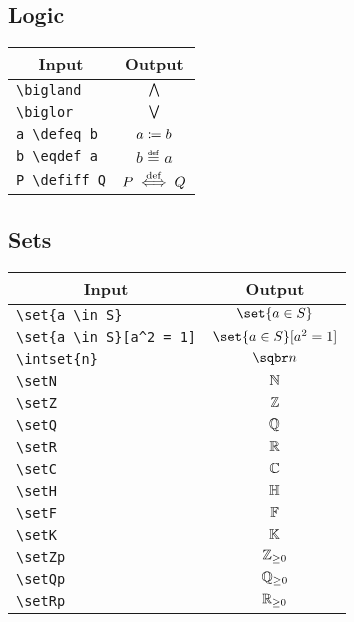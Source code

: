 \documentclass[a4paper, 11pt]{article}
\begin{document}
\subsection{Logic}
\begin{center}
  \begin{tabular}{lc} \toprule
    \multicolumn{1}{c}{Input} & Output        \\\midrule
    \verb|\bigland|   & $\bigwedge$    \\
    \verb|\biglor|   & $\bigvee$     \\
    \verb|a \defeq b|   & $a \coloneqq b$  \\
    \verb|b \eqdef a|   & $b \eqdef a$  \\
    \verb|P \defiff Q|   & $P \overset{\mathrm{def}}{\iff} Q$ \\
    \bottomrule
  \end{tabular}
\end{center}

\subsection{Sets}
\begin{center}
  \begin{tabular}{lc} \toprule
    \multicolumn{1}{c}{Input} & Output                   \\\midrule
    \verb|\set{a \in S}|   & $\set{a \in S}$          \\
    \verb|\set{a \in S}[a^2 = 1]|   & $\set{a \in S}[a^2 = 1]$ \\
    \verb|\intset{n}|   & $\intset{n}$             \\
    \verb|\setN|   & $\mathbb{N}$                  \\
    \verb|\setZ|   & $\mathbb{Z}$                  \\
    \verb|\setQ|   & $\mathbb{Q}$                  \\
    \verb|\setR|   & $\mathbb{R}$                  \\
    \verb|\setC|   & $\mathbb{C}$                  \\
    \verb|\setH|   & $\mathbb{H}$                  \\
    \verb|\setF|   & $\mathbb{F}$                  \\
    \verb|\setK|   & $\mathbb{K}$                  \\
    \verb|\setZp|   & $\mathbb{Z}_{\geq 0}$                 \\
    \verb|\setQp|   & $\mathbb{Q}_{\geq 0}$                 \\
    \verb|\setRp|   & $\mathbb{R}_{\geq 0}$                 \\
    \bottomrule
  \end{tabular}
\end{center}
\end{document}
